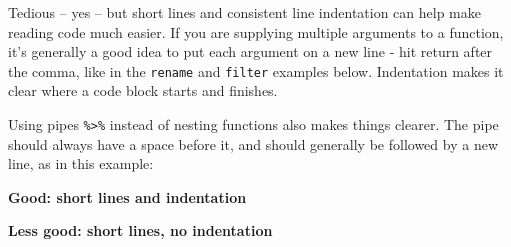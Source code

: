 \documentclass[]{book}
\newenvironment{Shaded}{\begin{snugshade}}{\end{snugshade}}
\newcommand{\DataTypeTok}[1]{\textcolor[rgb]{0.13,0.29,0.53}{#1}}
\newcommand{\DecValTok}[1]{\textcolor[rgb]{0.00,0.00,0.81}{#1}}
\newcommand{\KeywordTok}[1]{\textcolor[rgb]{0.13,0.29,0.53}{\textbf{#1}}}
\newcommand{\NormalTok}[1]{#1}
\newcommand{\OperatorTok}[1]{\textcolor[rgb]{0.81,0.36,0.00}{\textbf{#1}}}
\newcommand{\OtherTok}[1]{\textcolor[rgb]{0.56,0.35,0.01}{#1}}
\newcommand{\StringTok}[1]{\textcolor[rgb]{0.31,0.60,0.02}{#1}}
\begin{document}
Tedious -- yes -- but short lines and consistent line indentation can help make reading code much easier. If you are supplying multiple arguments to a function, it's generally a good idea to put each argument on a new line - hit return after the comma, like in the \texttt{rename} and \texttt{filter} examples below. Indentation makes it clear where a code block starts and finishes.

Using pipes \texttt{\%\textgreater{}\%} instead of nesting functions also makes things clearer. The pipe should always have a space before it, and should generally be followed by a new line, as in this example:

\textbf{Good: short lines and indentation}

\begin{Shaded}
\end{Shaded}

\textbf{Less good: short lines, no indentation}

\begin{Shaded}
\end{Shaded}
\end{document}
